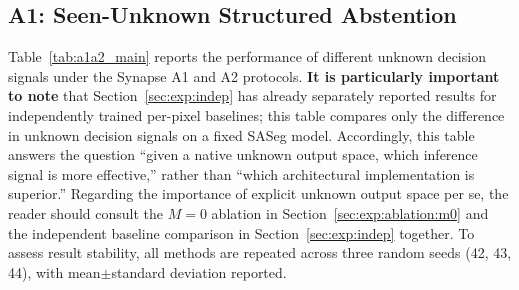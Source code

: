 \documentclass[journal]{IEEEtai}
\begin{document}
\subsection{A1: Seen-Unknown Structured Abstention}\label{sec:exp:a1}

Table~\ref{tab:a1a2_main} reports the performance of different unknown decision signals
under the Synapse A1 and A2 protocols.
\textbf{It is particularly important to note} that Section~\ref{sec:exp:indep} has
already separately reported results for independently trained per-pixel baselines;
this table compares only the difference in unknown decision signals on a fixed SASeg
model.
Accordingly, this table answers the question ``given a native unknown output space,
which inference signal is more effective,'' rather than ``which architectural
implementation is superior.''
Regarding the importance of explicit unknown output space per se, the reader should
consult the $M=0$ ablation in Section~\ref{sec:exp:ablation:m0} and the independent
baseline comparison in Section~\ref{sec:exp:indep} together.
To assess result stability, all methods are repeated across three random seeds
(42, 43, 44), with mean$\pm$standard deviation reported.
\end{document}
